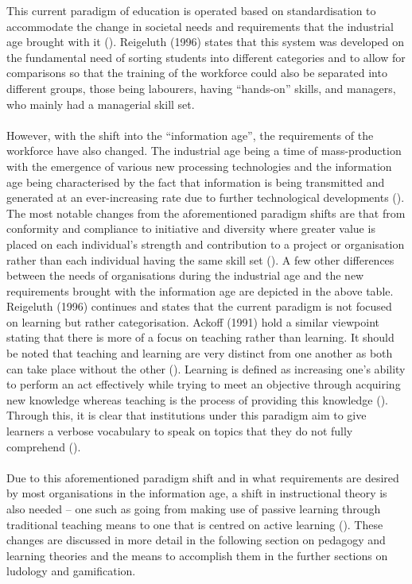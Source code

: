 \noindent This current paradigm of education is operated based on standardisation to accommodate the change in societal needs and requirements that the industrial age brought with it (\cite{Reigeluth1996}). Reigeluth (1996) states that this system was developed on the fundamental need of sorting students into different categories and to allow for comparisons so that the training of the workforce could also be separated into different groups, those being labourers, having “hands-on” skills, and managers, who mainly had a managerial skill set. 
\\\\
However, with the shift into the “information age”, the requirements of the workforce have also changed. The industrial age being a time of mass-production with the emergence of various new processing technologies and the information age being characterised by the fact that information is being transmitted and generated at an ever-increasing rate due to further technological developments (\cite{gibson2006games, Reigeluth1996}). The most notable changes from the aforementioned paradigm shifts are that from conformity and compliance to initiative and diversity where greater value is placed on each individual’s strength and contribution to a project or organisation rather than each individual having the same skill set (\cite{Reigeluth1996}).  A few other differences between the needs of organisations during the industrial age and the new requirements brought with the information age are depicted in the above table.
\newpage
\noindent Reigeluth (1996) continues and states that the current paradigm is not focused on learning but rather categorisation. Ackoff (1991) hold a similar viewpoint stating that there is more of a focus on teaching rather than learning. It should be noted that teaching and learning are very distinct from one another as both can take place without the other (\cite{Ackoff1991}). Learning is defined as increasing one’s ability to perform an act effectively while trying to meet an objective through acquiring new knowledge whereas teaching is the process of providing this knowledge (\cite{Ackoff1991}). Through this, it is clear that institutions under this paradigm aim to give learners a verbose vocabulary to speak on topics that they do not fully comprehend (\cite{Ackoff1991}). 
\\\\
Due to this aforementioned paradigm shift and in what requirements are desired by most organisations in the information age, a shift in instructional theory is also needed – one such as going from making use of passive learning through traditional teaching means to one that is centred on active learning (\cite{Reigeluth1996}). These changes are discussed in more detail in the following section on pedagogy and learning theories and the means to accomplish them in the further sections on ludology and gamification.

